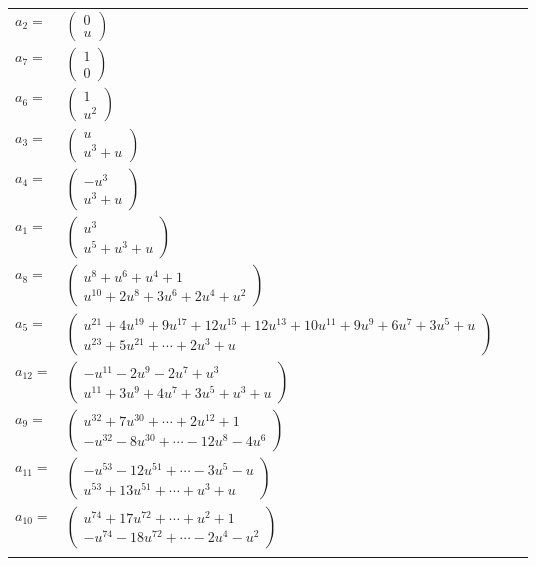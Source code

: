 \documentclass[1p]{elsarticle_modified}
\theoremstyle{definition}
\begin{document}
\begin{tabular}{m{7pt} m{180pt} m{7pt} m{180pt} }
\flushright $a_{2}=$&$\begin{pmatrix}0\\u\end{pmatrix}$ \\
\flushright $a_{7}=$&$\begin{pmatrix}1\\0\end{pmatrix}$ \\
\flushright $a_{6}=$&$\begin{pmatrix}1\\u^2\end{pmatrix}$ \\
\flushright $a_{3}=$&$\begin{pmatrix}u\\u^3+u\end{pmatrix}$ \\
\flushright $a_{4}=$&$\begin{pmatrix}- u^3\\u^3+u\end{pmatrix}$ \\
\flushright $a_{1}=$&$\begin{pmatrix}u^3\\u^5+u^3+u\end{pmatrix}$ \\
\flushright $a_{8}=$&$\begin{pmatrix}u^8+u^6+u^4+1\\u^{10}+2 u^8+3 u^6+2 u^4+u^2\end{pmatrix}$ \\
\flushright $a_{5}=$&$\begin{pmatrix}u^{21}+4 u^{19}+9 u^{17}+12 u^{15}+12 u^{13}+10 u^{11}+9 u^9+6 u^7+3 u^5+u\\u^{23}+5 u^{21}+\cdots+2 u^3+u\end{pmatrix}$ \\
\flushright $a_{12}=$&$\begin{pmatrix}- u^{11}-2 u^9-2 u^7+u^3\\u^{11}+3 u^9+4 u^7+3 u^5+u^3+u\end{pmatrix}$ \\
\flushright $a_{9}=$&$\begin{pmatrix}u^{32}+7 u^{30}+\cdots+2 u^{12}+1\\- u^{32}-8 u^{30}+\cdots-12 u^8-4 u^6\end{pmatrix}$ \\
\flushright $a_{11}=$&$\begin{pmatrix}- u^{53}-12 u^{51}+\cdots-3 u^5- u\\u^{53}+13 u^{51}+\cdots+u^3+u\end{pmatrix}$ \\
\flushright $a_{10}=$&$\begin{pmatrix}u^{74}+17 u^{72}+\cdots+u^2+1\\- u^{74}-18 u^{72}+\cdots-2 u^4- u^2\end{pmatrix}$\\&\end{tabular}
\end{document}
